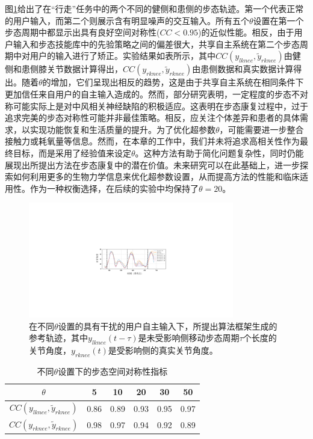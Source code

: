 图\ref{fig:5-5}给出了在``行走''任务中的两个不同的健侧和患侧的步态轨迹。第一个代表正常的用户输入，而第二个则展示含有明显噪声的交互输入。所有五个$\theta$设置在第一个步态周期中都显示出具有良好空间对称性($CC<0.95$)的近似性能。相反，由于用户输入和步态技能库中的先验策略之间的偏差很大，共享自主系统在第二个步态周期中对用户的输入进行了矫正。实验结果如表\uppercase \expandafter{}所示，其中${CC}({y_{lknee}},{\tilde y_{rknee}})$由健侧和患侧膝关节数据计算得出，${CC}({y_{rknee}},{\tilde y_{rknee}})$由患侧数据和真实数据计算得出。随着$\theta $的增加，它们呈现出相反的趋势，这是由于共享自主系统在相同条件下更加信任来自用户的自主输入造成的。然而，部分研究表明，一定程度的步态不对称可能实际上是对中风相关神经缺陷的积极适应。这表明在步态康复过程中，过于追求完美的步态对称性可能并非最佳策略。相反，应关注个体差异和患者的具体需求，以实现功能恢复和生活质量的提升\cite{balabanGaitDisturbancesPatients2014}。为了优化超参数$\theta $，可能需要进一步整合接触力或耗氧量等信息。然而，在本章的工作中，我们并未将追求高相关性作为最终目标，而是采用了经验值来设定$\theta $。这种方法有助于简化问题复杂性，同时仍能展现出所提出方法在步态康复中的潜在价值。未来研究可以在此基础上，进一步探索如何利用更多的生物力学信息来优化超参数设置，从而提高方法的性能和临床适用性。作为一种权衡选择，在后续的实验中均保持了$\theta =20$。


\begin{figure}[htb]
  \centering\includegraphics[width=0.8\textwidth]{figures/5-Fig-5.pdf}
  \caption{在不同$\theta $设置的具有干扰的用户自主输入下，所提出算法框架生成的参考轨迹，其中${y_{lknee}}(t - \tau )$是未受影响侧移动步态周期$\tau $个长度的关节角度，${y_{rknee}}(t)$是受影响侧的真实关节角度。}
  \label{fig:5-5}
\end{figure}

\begin{table}[htb]
  \centering
  \caption{不同$\theta $设置下的步态空间对称性指标}
  \begin{tabular}{cccccc}
  \toprule
          $\theta $         & 5 & 10 & 20 & 30 & 50  \\ 
  \midrule
          ${CC}({y_{lknee}},{\tilde y_{rknee}})$         & 0.86	&0.89	&0.93	&0.95	&0.97  \\ 
          ${CC}({y_{rknee}},{\tilde y_{rknee}})$         & 0.98 &0.97	&0.94	&0.92	&0.89  \\ 
  \bottomrule
  \end{tabular}
  \label{tab:5-1} 
\end{table}   

